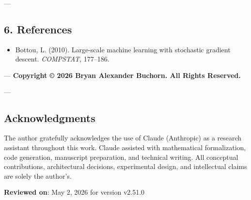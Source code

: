 ---

\subsection{6. References}

\begin{itemize}
\item [bottou\-2010\-large] Bottou, L. (2010). Large-scale machine learning with stochastic gradient descent. \textit{COMPSTAT}, 177–186.

\end{itemize}
---
\textbf{Copyright © 2026 Bryan Alexander Buchorn. All Rights Reserved.}

---
\subsection{Acknow\-ledgments}

The author gratefully ackno\-wledges the use of Claude (Anthropic) as a research assistant throughout this work. Claude assisted with mathe\-matical forma\-lization, code generation, manuscript preparation, and technical writing. All conceptual contr\-ibutions, archi\-tectural decisions, exper\-imental design, and intel\-lectual claims are solely the author's.

\textbf{Reviewed on}: May 2, 2026 for version v2.51.0
